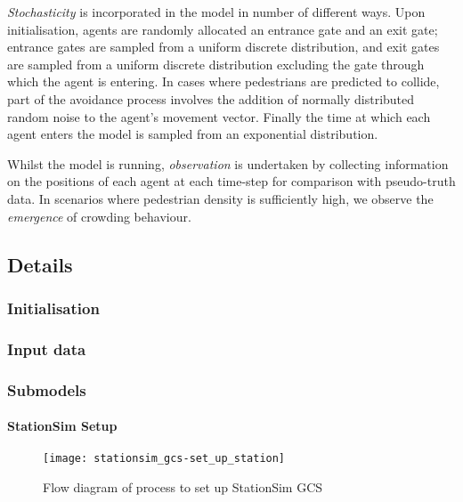 \emph{Stochasticity} is incorporated in the model in number of different ways.
Upon initialisation, agents are randomly allocated an entrance gate and an exit
gate; entrance gates are sampled from a uniform discrete distribution, and exit
gates are sampled from a uniform discrete distribution excluding the gate
through which the agent is entering.
In cases where pedestrians are predicted to collide, part of the avoidance
process involves the addition of normally distributed random noise to the
agent's movement vector.
Finally the time at which each agent enters the model is sampled from an
exponential distribution.

Whilst the model is running, \emph{observation} is undertaken by collecting
information on the positions of each agent at each time-step for comparison with
pseudo-truth data.
In scenarios where pedestrian density is sufficiently high, we observe the
\emph{emergence} of crowding behaviour.

\subsection{Details}\label{sub:stationsim:details}

\subsubsection{Initialisation}\label{subs:stationsim:details:initialisation}

\subsubsection{Input data}\label{subs:stationsim:details:input}

\subsubsection{Submodels}\label{subs:stationsim:details:submodels}

\paragraph{StationSim Setup}\label{para:submodels:setup}

\begin{figure}[h]
    \centering
    \texttt{[image: stationsim\_gcs-set\_up\_station]}
    \caption{Flow diagram of process to set up StationSim GCS}
    \label{fig:flow:set_up_station}
\end{figure}

